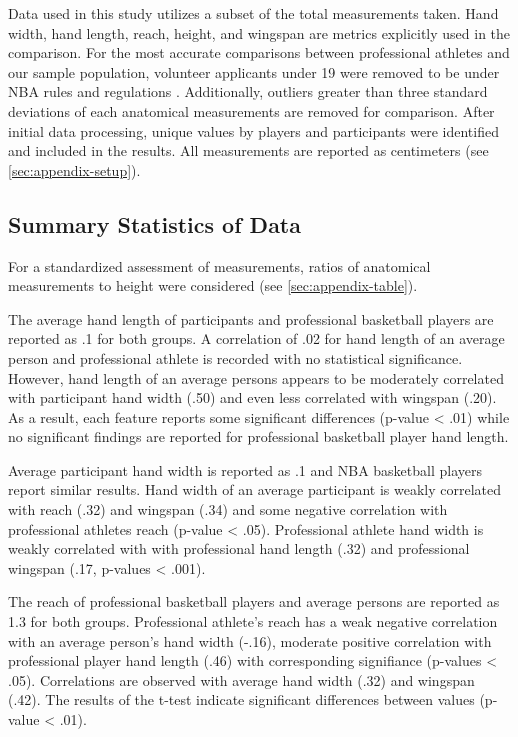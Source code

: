 \documentclass[]{article}
\begin{document}
Data used in this study utilizes a subset of the total measurements
taken. Hand width, hand length, reach, height, and wingspan are metrics
explicitly used in the comparison. For the most accurate comparisons
between professional athletes and our sample population, volunteer
applicants under 19 were removed to be under NBA rules and regulations
\citep{reynolds:2019}. Additionally, outliers greater than three
standard deviations of each anatomical measurements are removed for
comparison. After initial data processing, unique values by players and
participants were identified and included in the results. All
measurements are reported as centimeters (see \ref{sec:appendix-setup}).

\subsection{Summary Statistics of Data}
\label{sec:data-summary}

For a standardized assessment of measurements, ratios of anatomical
measurements to height were considered (see \ref{sec:appendix-table}).

The average hand length of participants and professional basketball
players are reported as .1 for both groups. A correlation of .02 for
hand length of an average person and professional athlete is recorded
with no statistical significance. However, hand length of an average
persons appears to be moderately correlated with participant hand width
(.50) and even less correlated with wingspan (.20). As a result, each
feature reports some significant differences (p-value \textless{} .01)
while no significant findings are reported for professional basketball
player hand length.

Average participant hand width is reported as .1 and NBA basketball
players report similar results. Hand width of an average participant is
weakly correlated with reach (.32) and wingspan (.34) and some negative
correlation with professional athletes reach (p-value \textless{} .05).
Professional athlete hand width is weakly correlated with with
professional hand length (.32) and professional wingspan (.17, p-values
\textless{} .001).

The reach of professional basketball players and average persons are
reported as 1.3 for both groups. Professional athlete's reach has a weak
negative correlation with an average person's hand width (-.16),
moderate positive correlation with professional player hand length (.46)
with corresponding signifiance (p-values \textless{} .05). Correlations
are observed with average hand width (.32) and wingspan (.42). The
results of the t-test indicate significant differences between values
(p-value \textless{} .01).
\end{document}
